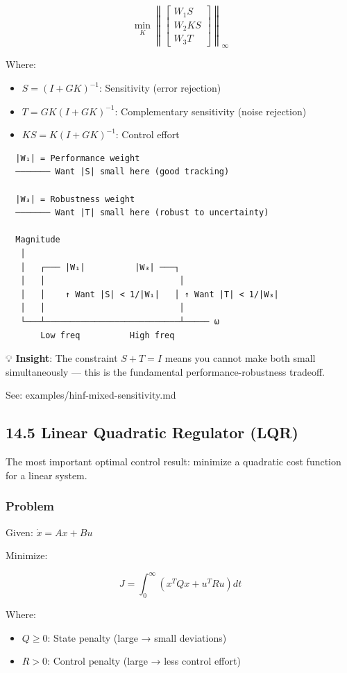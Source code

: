 \documentclass[11pt,a4paper]{book}
\begin{document}
\begin{itemize}
\[\min_K \left\| \begin{bmatrix} W_1 S \\ W_2 KS \\ W_3 T \end{bmatrix} \right\|_\infty\]

Where:
\begin{itemize}
\item $S = (I + GK)^{-1}$: Sensitivity (error rejection)
\item $T = GK(I + GK)^{-1}$: Complementary sensitivity (noise rejection)
\item $KS = K(I + GK)^{-1}$: Control effort
\end{itemize}

\begin{lstlisting}
  |W₁| = Performance weight
  ─────── Want |S| small here (good tracking)
  
  |W₃| = Robustness weight
  ─────── Want |T| small here (robust to uncertainty)
  
  Magnitude
   │
   │   ┌─── |W₁|          |W₃| ───┐
   │   │                           │
   │   │    ↑ Want |S| < 1/|W₁|   │ ↑ Want |T| < 1/|W₃|
   │   │                           │
   └───┴───────────────────────────┴───── ω
       Low freq          High freq
\end{lstlisting}

💡 \textbf{Insight}: The constraint $S + T = I$ means you cannot make both small simultaneously — this is the fundamental performance-robustness tradeoff.

See: examples/hinf-mixed-sensitivity.md

\medskip\noindent\hrulefill\medskip

\subsection{14.5 Linear Quadratic Regulator (LQR)}

The most important optimal control result: minimize a quadratic cost function for a linear system.

\subsubsection{Problem}

Given: $\dot{x} = Ax + Bu$

Minimize:

\[J = \int_0^\infty \left( x^T Q x + u^T R u \right) dt\]

Where:
\begin{itemize}
\item $Q \geq 0$: State penalty (large → small deviations)
\item $R > 0$: Control penalty (large → less control effort)
\end{itemize}


\end{itemize}
\end{document}
